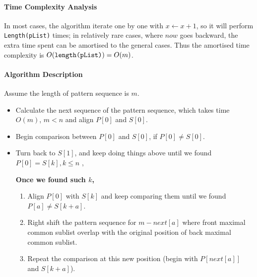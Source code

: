 \begin{questions}
\begin{algorithm}
    \end{algorithm}

    \paragraph{Time Complexity Analysis}
    In most cases, the algorithm iterate one by one with $x\gets x + 1$, so it will perform \texttt{Length(pList)} times; in relatively rare cases, where $now$ goes backward, the extra time spent can be amortised to the general cases. Thus the amortised time complexity is $O(\mbox{\texttt{length(pList)}}) = O(m)$.

    \paragraph{Algorithm Description}Assume the length of pattern sequence is $m$.
    \begin{itemize}
        \item Calculate the next sequence of the pattern sequence, which takes time $O(m)$, $m<n$ and align $P[0]$ and $S[0]$.
        \item Begin comparison between $P[0]$ and $S[0]$, if $P[0]\neq S[0]$.
        \item Turn back to $S[1]$, and keep doing things above until we found $P[0]=S[k], k\leq n$ ,
        
        \textbf{Once we found such $k$,}
        \begin{enumerate}
            \item Align $P[0] $ with $S[k]$ and keep comparing them until we found $P[a]\neq S[k+a]$.
            \item Right shift the pattern sequence for $m-next[a]$ where front maximal common sublist overlap with the original position of back maximal common sublist.
            \item Repeat the comparison at this new position (begin with $P[next[a]]$ and $S[k+a]$).
        \end{enumerate}


\end{itemize}
\end{questions}
